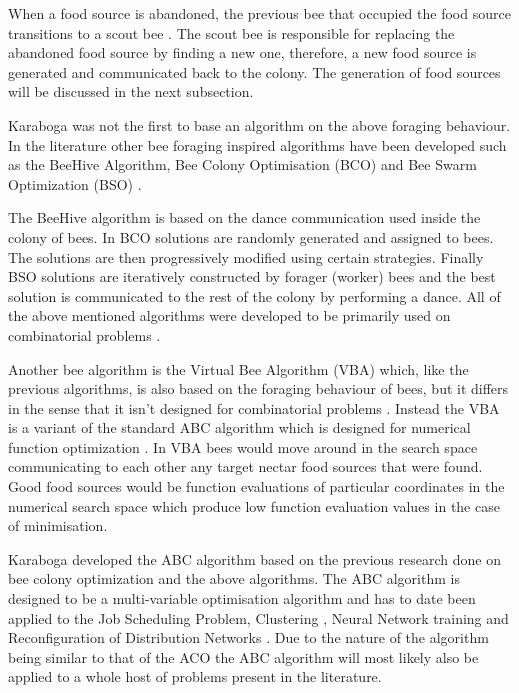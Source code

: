 When a food source is abandoned, the previous bee that occupied the food source transitions to a scout bee \cite{ABCCompareStudy,ABCNumericalOptimization}. The scout bee is responsible for replacing the abandoned food source by finding a new one, therefore, a new food source is generated and communicated back to the colony\cite{ABCCompareStudy,ABCImageEnhancement,ABCNumericalOptimization}. The generation of food sources will be discussed in the next subsection.

Karaboga was not the first to base an algorithm on the above foraging behaviour. In the literature other bee foraging inspired algorithms have been developed such as the BeeHive Algorithm, Bee Colony Optimisation (BCO) and Bee Swarm Optimization (BSO) \cite{BCO,HybridABCClustering,ABCNumericalOptimization}. 

The BeeHive algorithm is based on the dance communication used inside the colony of bees. In BCO solutions are randomly generated and assigned to bees\cite{HybridABCClustering,ABCNumericalOptimization}. The solutions are then progressively modified using certain strategies. Finally BSO solutions are iteratively constructed by forager (worker) bees and the best solution is communicated to the rest of the colony by performing a dance\cite{HybridABCClustering,ABCNumericalOptimization}. All of the above mentioned algorithms were developed to be primarily used on combinatorial problems \cite{ABCCompareStudy}.

Another bee algorithm is the Virtual Bee Algorithm (VBA) which, like the previous algorithms, is also based on the foraging behaviour of bees, but it differs in the sense that it isn't designed for combinatorial problems \cite{ABCNumericalOptimization}. Instead the VBA is a variant of the standard ABC algorithm which is designed for numerical function optimization \cite{ABCNumericalOptimization}. In VBA bees would move around in the search space communicating to each other any target nectar food sources that were found\cite{ABCNumericalOptimization}. Good food sources would be function evaluations of particular coordinates in the numerical search space which produce low function evaluation values in the case of minimisation\cite{ABCNumericalOptimization}.

Karaboga developed the ABC algorithm based on the previous research done on bee colony optimization and the above algorithms. The ABC algorithm is designed to be a multi-variable optimisation algorithm and has to date been applied to the Job Scheduling Problem, Clustering \cite{HybridABCClustering}, Neural Network training and Reconfiguration of Distribution Networks \cite{ABCReconfigDistro}. Due to the nature of the algorithm being similar to that of the ACO the ABC algorithm will most likely also be applied to a whole host of problems present in the literature.

